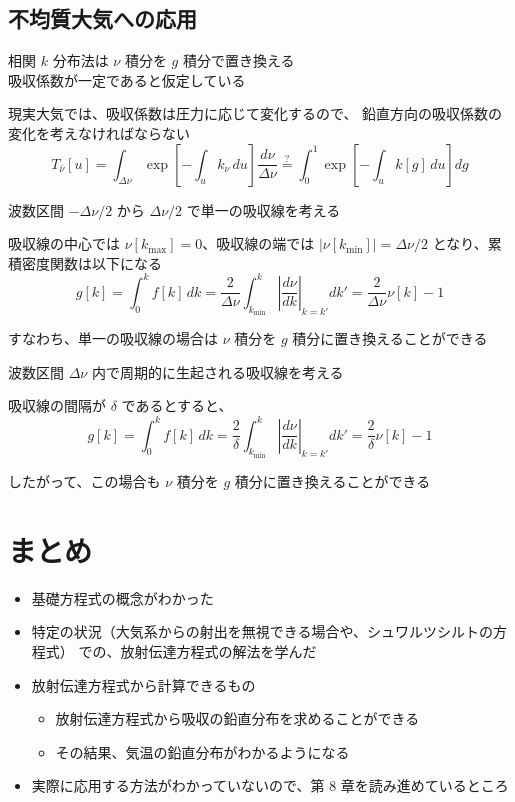 \documentclass[article]{dennou777}
\begin{document}
\subsection{不均質大気への応用}
相関 $k$ 分布法は $\nu$ 積分を $g$ 積分で置き換える\\
吸収係数が一定であると仮定している

現実大気では、吸収係数は圧力に応じて変化するので、
鉛直方向の吸収係数の変化を考えなければならない
\begin{equation}
	T_{\bar\nu}[u]
	=\int_{\Delta\nu}\exp\left[-\int_u k_\nu\,du\right]\frac{d\nu}{\Delta\nu}
	\stackrel{?}{=}\int^1_0\exp\left[-\int_uk[g]\,du\right]dg
\end{equation}

波数区間 $-\Delta\nu/2$ から $\Delta\nu/2$ で単一の吸収線を考える

吸収線の中心では $\nu[k_{\mathrm{max}}]=0$、吸収線の端では
$|\nu[k_{\mathrm{min}}]|=\Delta\nu/2$ となり、累積密度関数は以下になる
\begin{equation}
	g[k]=\int^k_0 f[k]\,dk
	=\frac{2}{\Delta\nu}\int^k_{k_{\mathrm{min}}}\left|\frac{d\nu}{dk}\right|_{k=k'}dk'
	=\frac{2}{\Delta\nu}\nu[k]-1
\end{equation}

すなわち、単一の吸収線の場合は $\nu$ 積分を $g$ 積分に置き換えることができる

波数区間 $\Delta\nu$ 内で周期的に生起される吸収線を考える

吸収線の間隔が $\delta$ であるとすると、
\begin{equation}
	g[k]=\int^k_0 f[k]\,dk
	=\frac{2}{\delta}\int^k_{k_{\mathrm{min}}}\left|\frac{d\nu}{dk}\right|_{k=k'}dk'
	=\frac{2}{\delta}\nu[k]-1
\end{equation}

したがって、この場合も $\nu$ 積分を $g$ 積分に置き換えることができる

\section{まとめ}

\begin{itemize}
	\item 基礎方程式の概念がわかった
	\item 特定の状況（大気系からの射出を無視できる場合や、シュワルツシルトの方程式）
		での、放射伝達方程式の解法を学んだ
	\item 放射伝達方程式から計算できるもの
		\begin{itemize}
			\item 放射伝達方程式から吸収の鉛直分布を求めることができる
			\item その結果、気温の鉛直分布がわかるようになる
		\end{itemize}
	\item 実際に応用する方法がわかっていないので、第 8 章を読み進めているところ
\end{itemize}
\end{document}
